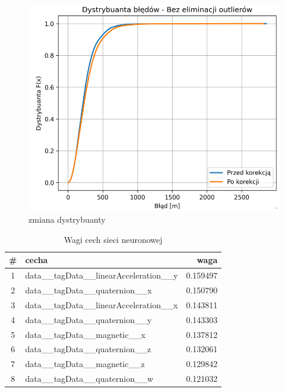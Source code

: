 \documentclass{classrep}
\begin{document}
{\begin{figure}[h!]
	  \label{fig:błedyXY}
  \end{figure}
  \begin{figure}[h!]
	  \centering
	  \includegraphics[scale=0.40]{dystrb.png}
	  \caption{zmiana dystrybuanty}
	  \label{fig:dystrybuanta}
  \end{figure}
  \begin{table}[ht]
	  \centering
	  \caption{Wagi cech sieci neuronowej}
	  \begin{tabular}{|c|l|r|}
		  \hline
		  \textbf{\#} & \textbf{cecha}                             & \textbf{waga} \\
		  \hline
		  1           & data\_\_tagData\_\_linearAcceleration\_\_y & 0.159497      \\
		  2           & data\_\_tagData\_\_quaternion\_\_x         & 0.150790      \\
		  3           & data\_\_tagData\_\_linearAcceleration\_\_x & 0.143811      \\
		  4           & data\_\_tagData\_\_quaternion\_\_y         & 0.143303      \\
		  5           & data\_\_tagData\_\_magnetic\_\_x           & 0.137812      \\
		  6           & data\_\_tagData\_\_quaternion\_\_z         & 0.132061      \\
		  7           & data\_\_tagData\_\_magnetic\_\_z           & 0.129842      \\
		  8           & data\_\_tagData\_\_quaternion\_\_w         & 0.121032      \\

\end{tabular}
\end{table}}
\end{document}

